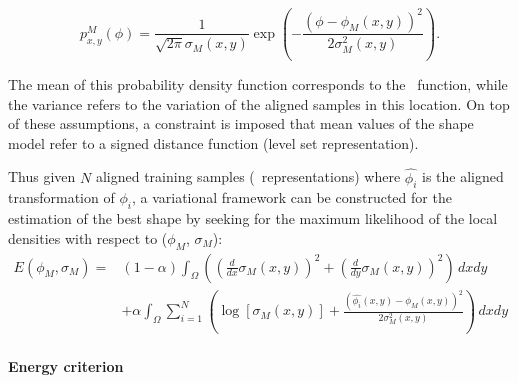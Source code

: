 \begin{equation}
  \label{eq:DensityFunctions-rousson}
  p_{x,y}^M(\phi) = \frac{1}{\sqrt{2\pi}\sigma_M(x,y)} \exp\left(-\frac{(\phi-\phi_M(x,y))^2}{2\sigma_M^2(x,y)} \right).
\end{equation}

The mean of this probability density function corresponds to the \ls~function, while the variance refers to the variation of the aligned samples in this location. On top of these assumptions, a constraint is imposed that mean values of the shape model
refer to a signed distance function (level set representation).

Thus given $N$ aligned training samples (\ls~representations) where $\hat{\phi_i}$ is the aligned transformation of $\phi_i$, a variational framework can be constructed for the estimation of the best shape by seeking for the maximum likelihood of the local densities with respect to ($\phi_M$, $\sigma_M$):
\begin{align}
  \label{eq:NRJAlign-rousson}
  \nonumber E(\phi_M,\sigma_M) = & (1-\alpha)\int_\Omega \left( \left(\frac{d}{dx}\sigma_M(x,y)\right)^2 + \left(\frac{d}{dy}\sigma_M(x,y)\right)^2 \right) \, dxdy \\
  & + \alpha \int_\Omega \sum_{i=1}^N{ \left(\log[\sigma_M(x,y)] + \frac{(\hat{\phi_i}(x,y) - \phi_M(x,y))^2}{2\sigma_M^2(x,y)}\right) } \, dxdy
\end{align}

\paragraph{Energy criterion}
~\par \vspace{0.3cm}

